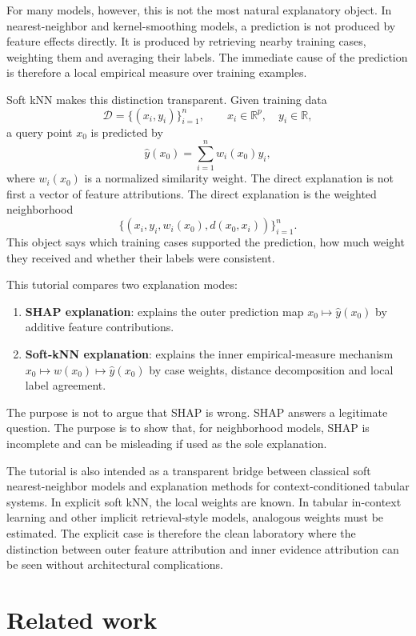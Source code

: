 \documentclass[11pt]{article}
\newcommand{\R}{\mathbb{R}}
\newcommand{\1}{\mathbf{1}}
\begin{document}
For many models, however, this is not the most natural explanatory object. In nearest-neighbor and kernel-smoothing models, a prediction is not produced by feature effects directly. It is produced by retrieving nearby training cases, weighting them and averaging their labels. The immediate cause of the prediction is therefore a local empirical measure over training examples.

Soft kNN makes this distinction transparent. Given training data
\[
\mathcal D=\{(x_i,y_i)\}_{i=1}^n, \qquad x_i\in\R^p,\quad y_i\in\R,
\]
a query point $x_0$ is predicted by
\[
\hat y(x_0)=\sum_{i=1}^n w_i(x_0)y_i,
\]
where $w_i(x_0)$ is a normalized similarity weight. The direct explanation is not first a vector of feature attributions. The direct explanation is the weighted neighborhood
\[
\{(x_i,y_i,w_i(x_0),d(x_0,x_i))\}_{i=1}^n.
\]
This object says which training cases supported the prediction, how much weight they received and whether their labels were consistent.

This tutorial compares two explanation modes:
\begin{enumerate}[leftmargin=*]
    \item \textbf{SHAP explanation}: explains the outer prediction map $x_0\mapsto \hat y(x_0)$ by additive feature contributions.
    \item \textbf{Soft-kNN explanation}: explains the inner empirical-measure mechanism $x_0\mapsto w(x_0)\mapsto \hat y(x_0)$ by case weights, distance decomposition and local label agreement.
\end{enumerate}

The purpose is not to argue that SHAP is wrong. SHAP answers a legitimate question. The purpose is to show that, for neighborhood models, SHAP is incomplete and can be misleading if used as the sole explanation.

The tutorial is also intended as a transparent bridge between classical soft nearest-neighbor models and explanation methods for context-conditioned tabular systems. In explicit soft kNN, the local weights are known. In tabular in-context learning and other implicit retrieval-style models, analogous weights must be estimated. The explicit case is therefore the clean laboratory where the distinction between outer feature attribution and inner evidence attribution can be seen without architectural complications.

\section{Related work}
\end{document}
